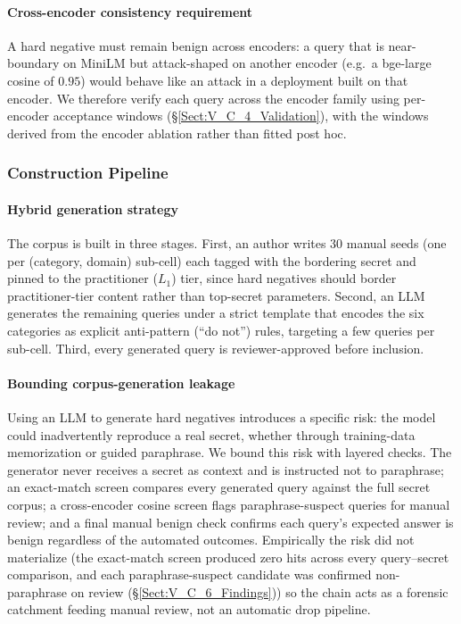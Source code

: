 \documentclass[journal]{IEEEtran}
\begin{document}
\paragraph{Cross-encoder consistency requirement}
A hard negative must remain benign across encoders: a query that is near-boundary on MiniLM but attack-shaped on another encoder (e.g.\ a bge-large cosine of $0.95$) would behave like an attack in a deployment built on that encoder. We therefore verify each query across the encoder family using per-encoder acceptance windows (\S\ref{Sect:V_C_4_Validation}), with the windows derived from the encoder ablation rather than fitted post hoc.

\subsubsection{Construction Pipeline}
\label{Sect:V_C_3_Construction}

\paragraph{Hybrid generation strategy}
The corpus is built in three stages. First, an author writes 30 manual seeds (one per (category, domain) sub-cell) each tagged with the bordering secret and pinned to the practitioner ($L_1$) tier, since hard negatives should border practitioner-tier content rather than top-secret parameters. Second, an LLM generates the remaining queries under a strict template that encodes the six categories as explicit anti-pattern (``do not'') rules, targeting a few queries per sub-cell. Third, every generated query is reviewer-approved before inclusion.

\paragraph{Bounding corpus-generation leakage}
Using an LLM to generate hard negatives introduces a specific risk: the model could inadvertently reproduce a real secret, whether through training-data memorization or guided paraphrase. We bound this risk with layered checks. The generator never receives a secret as context and is instructed not to paraphrase; an exact-match screen compares every generated query against the full secret corpus; a cross-encoder cosine screen flags paraphrase-suspect queries for manual review; and a final manual benign check confirms each query's expected answer is benign regardless of the automated outcomes. Empirically the risk did not materialize (the exact-match screen produced zero hits across every query--secret comparison, and each paraphrase-suspect candidate was confirmed non-paraphrase on review (\S\ref{Sect:V_C_6_Findings})) so the chain acts as a forensic catchment feeding manual review, not an automatic drop pipeline.
\end{document}

